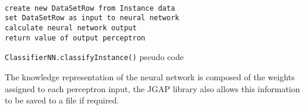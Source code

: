 \documentclass[a4paper]{article}
\begin{document}
\begin{listing}[H]
  \begin{verbatim}

create new DataSetRow from Instance data
set DataSetRow as input to neural network
calculate neural network output
return value of output perceptron

  \end{verbatim}
  \caption{\texttt{ClassifierNN.classifyInstance()} pseudo code}
  \label{list:ClassifierNN_classifyInstance}
\end{listing}

The knowledge representation of the neural network is composed of the weights
assigned to each perceptron input, the JGAP library also allows this information
to be saved to a file if required.

\printbibliography
\end{document}
